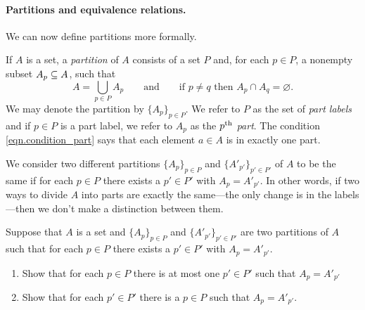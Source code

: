 \documentclass[7Sketches]{subfiles}
\begin{document}
%
\paragraph{Partitions and equivalence relations.}%

We can now define partitions more formally.

\begin{definition}%
\label{def.partition}%
If $A$ is a set, a \emph{partition} of $A$ consists of a set $P$ and, for each $p\in P$, a nonempty subset $A_p\ss A$, such that 
\begin{equation}%
\label{eqn.condition_part}
  A=\bigcup_{p\in P}A_p
  \qquad\text{and}\qquad
  \text{if }p\neq q\text{ then }A_p\cap A_q=\varnothing.
\end{equation}
We may denote the partition by $\{A_p\}_{p\in P}$. We refer to $P$ as the set of \emph{part labels} and if $p\in P$ is a part label, we refer to $A_p$ as the \emph{$p^{\tn{th}}$ part}. The condition \eqref{eqn.condition_part} says that each element $a\in A$ is in exactly one part.

We consider two different partitions $\{A_p\}_{p\in P}$ and $\{A'_{p'}\}_{p'\in P'}$ of $A$ to be the same if for each $p\in P$ there exists a $p'\in P'$ with $A_p=A'_{p'}$. In other words, if two ways to divide $A$ into parts are exactly the same---the only change is in the labels---then we don't make a distinction between them.%
\end{definition}

\begin{exercise}%
\label{exc.proof_re_parts}
Suppose that $A$ is a set and $\{A_p\}_{p\in P}$ and $\{A'_{p'}\}_{p'\in P'}$ are two partitions of $A$ such that for each $p\in P$ there exists a $p'\in P'$ with $A_p=A'_{p'}$.
\begin{enumerate}
	\item Show that for each $p\in P$ there is at most one $p'\in P'$ such that $A_p=A'_{p'}$
	\item Show that for each $p'\in P'$ there is a $p\in P$ such that $A_p=A'_{p'}$.
	\qedhere
\qedhere
\end{enumerate}
\end{exercise}
\end{document}
